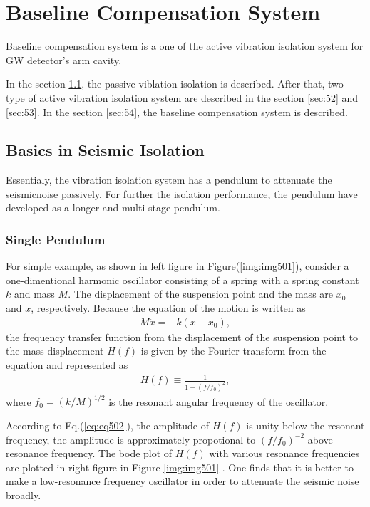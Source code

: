 \chapter{Baseline Compensation System} \label{chap4}
Baseline compensation system is a one of the active vibration isolation system for GW detector's arm cavity. 

In the section \cref{sec:51}, the passive viblation isolation is described. After that, two type of active vibration isolation system are described in the section \cref{sec:52} and \cref{sec:53}. In the section \cref{sec:54}, the baseline compensation system is described.

\section{Basics in Seismic Isolation}\label{sec:51}
Essentialy, the vibration isolation system has a pendulum to attenuate the seismicnoise passively. For further the isolation performance, the pendulum have developed as a longer and multi-stage pendulum.

\subsection{Single Pendulum}
For simple example, as shown in left figure in Figure(\ref{img:img501}), consider a one-dimentional harmonic oscillator consisting of a spring with a spring constant $k$ and mass $M$. The displacement of the suspension point and the mass are $x_0$ and $x$, respectively. Because the equation of the motion is written as
\begin{eqnarray} \label{eq:eq501}
  M\ddot{x} = -k(x-x_0),
\end{eqnarray}
the frequency transfer function from the displacement of the suspension point to the mass displacement $H(f)$ is given by the Fourier transform from the equation and represented as
\begin{eqnarray} \label{eq:eq502}
  H(f) \equiv \frac{1}{1-(f/f_0)^2},
\end{eqnarray}
where $f_0 = (k/M)^{1/2}$ is the resonant angular frequency of the oscillator.

According to Eq.(\ref{eq:eq502}), the amplitude of $H(f)$ is unity below the resonant frequency, the amplitude is approximately propotional to $(f/f_0)^{-2}$ above resonance frequency. The bode plot of $H(f)$ with various resonance frequencies are plotted in right figure in Figure \ref{img:img501} . One finds that it is better to make a low-resonance frequency oscillator in order to attenuate the seismic noise broadly. 

